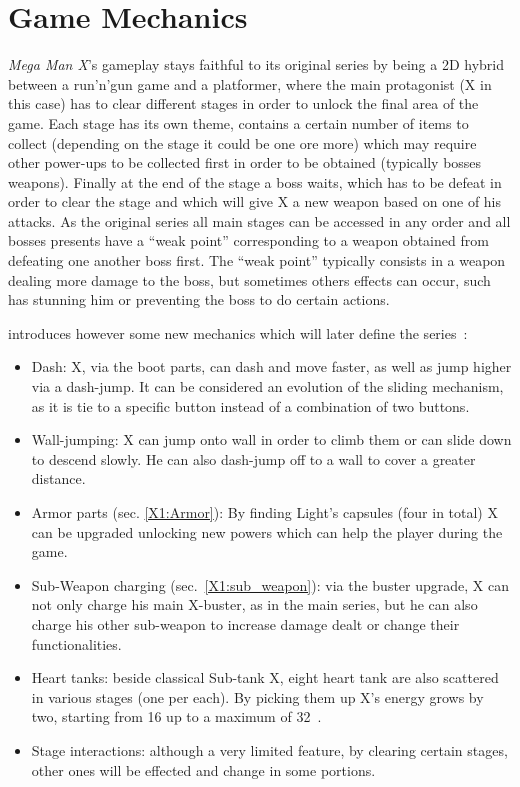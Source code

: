 \chapter{Game Mechanics}
\textit{Mega Man X}'s gameplay stays faithful to its original series by being a 2D hybrid between a run'n'gun game and a platformer, where the main protagonist (X in this case) has to clear different stages in order to unlock the final area of the game. Each stage has its own theme, contains a certain number of items to collect (depending on the stage it could be one ore more) which may require other power-ups to be collected first in order to be obtained (typically bosses weapons). Finally at the end of the stage a boss waits, which has to be defeat in order to clear the stage and which will give X a new weapon based on one of his attacks. As the original series all main stages can be accessed in any order and all bosses presents have a ``weak point'' corresponding to a weapon obtained from defeating one another boss first. The ``weak point'' typically consists in a weapon dealing more damage to the boss, but sometimes others effects can occur, such has stunning him or preventing the boss to do certain actions.

\x introduces however some new mechanics which will later define the series~\cite{wiki:X1_features}:
\begin{itemize}
	\item Dash: X, via the boot parts, can dash and move faster, as well as jump higher via a dash-jump. It can be considered an evolution of the sliding mechanism, as it is tie to a specific button instead of a combination of two buttons.
	\item Wall-jumping: X can jump onto wall in order to climb them or can slide down to descend slowly. He can also dash-jump off to a wall to cover a greater distance.
	\item Armor parts (sec. \ref{X1:Armor}): By finding Light's capsules (four in total) X can be upgraded unlocking new powers which can help the player during the game.
	\item Sub-Weapon charging (sec.~\ref{X1:sub_weapon}): via the buster upgrade, X can not only charge his main X-buster, as in the main series, but he can also charge his other sub-weapon to increase damage dealt or change their functionalities.
	\item Heart tanks: beside classical Sub-tank X, eight heart tank are also scattered in various stages (one per each). By picking them up X's energy grows by two, starting from 16 up to a maximum of 32~\cite{stratwiki:Heart_tank}.
	\item Stage interactions: although a very limited feature, by clearing certain stages, other ones will be effected and change in some portions.
\end{itemize}

